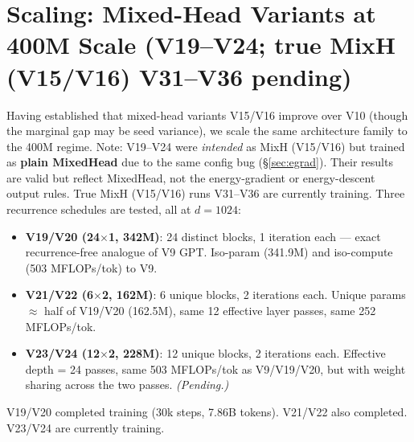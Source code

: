 \documentclass[11pt,a4paper]{article}
\begin{document}
\section{Scaling: Mixed-Head Variants at 400M Scale (V19--V24; true MixH (V15/V16) V31--V36 pending)}
\label{app:scaling}

Having established that mixed-head variants V15/V16 improve over V10 (though the
marginal gap may be seed variance), we scale the same architecture family to the 400M
regime.  Note: V19--V24 were \emph{intended} as MixH (V15/V16) but trained as
\textbf{plain MixedHead} due to the same config bug (\S\ref{sec:egrad}).  Their
results are valid but reflect MixedHead, not the energy-gradient or energy-descent
output rules.  True MixH (V15/V16) runs V31--V36 are currently training.  Three recurrence schedules are tested, all at $d{=}1024$:

\begin{itemize}
  \item \textbf{V19/V20 (24$\times$1, 342M)}: 24 distinct blocks, 1 iteration each --- exact
    recurrence-free analogue of V9 GPT.  Iso-param (341.9M) and iso-compute (503 MFLOPs/tok)
    to V9.
  \item \textbf{V21/V22 (6$\times$2, 162M)}: 6 unique blocks, 2 iterations each.  Unique
    params $\approx$ half of V19/V20 (162.5M), same 12 effective layer passes, same 252 MFLOPs/tok.
  \item \textbf{V23/V24 (12$\times$2, 228M)}: 12 unique blocks, 2 iterations each.
    Effective depth = 24 passes, same 503 MFLOPs/tok as V9/V19/V20, but with weight sharing
    across the two passes. \emph{(Pending.)}
\end{itemize}

V19/V20 completed training (30k steps, 7.86B tokens).  V21/V22 also completed.
V23/V24 are currently training.
\end{document}
